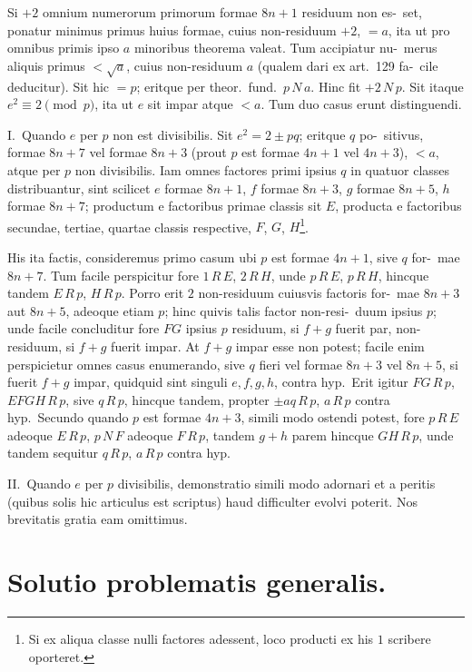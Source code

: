 \documentclass[12pt,a4paper]{article}
\theoremstyle{plain}
\theoremstyle{definition}
\theoremstyle{remark}
\begin{document}
Si $+2$ omnium numerorum primorum formae $8n+1$ residuum non es-\ set, ponatur minimus primus huius formae, cuius non-residuum $+2$, $= a$, ita
ut pro omnibus primis ipso $a$ minoribus theorema valeat. Tum accipiatur nu-\ merus aliquis primus $< \sqrt{a}$, cuius non-residuum $a$ (qualem dari ex art.~129 fa-\ cile deducitur). Sit hic $= p$; eritque per theor.\ fund.\ $p \, N \, a$. Hinc fit $+2 \, N \, p$.
Sit itaque $e^2 \equiv 2 \pmod{p}$, ita ut $e$ sit impar atque $< a$. Tum duo casus erunt
distinguendi.

I.\ Quando $e$ per $p$ non est divisibilis. Sit $e^2 = 2 \pm pq$; eritque $q$ po-\ sitivus, formae $8n+7$ vel formae $8n+3$ (prout $p$ est formae $4n+1$ vel
$4n+3$), $< a$, atque per $p$ non divisibilis. Iam omnes factores primi ipsius $q$
in quatuor classes distribuantur, sint scilicet $e$ formae $8n+1$, $f$ formae $8n+3$,
$g$ formae $8n+5$, $h$ formae $8n+7$; productum e factoribus primae classis sit
$E$, producta e factoribus secundae, tertiae, quartae classis respective, $F$, $G$, $H$\footnote{Si ex aliqua classe nulli factores adessent, loco producti ex his $1$ scribere oporteret.}.

His ita factis, consideremus primo casum ubi $p$ est formae $4n+1$, sive $q$ for-\ mae $8n+7$. Tum facile perspicitur fore $1 \, R \, E$, $2 \, R \, H$, unde $p \, R \, E$, $p \, R \, H$,
hincque tandem $E \, R \, p$, $H \, R \, p$. Porro erit $2$ non-residuum cuiusvis factoris for-\ mae $8n+3$ aut $8n+5$, adeoque etiam $p$; hinc quivis talis factor non-resi-\ duum ipsius $p$; unde facile concluditur fore $FG$ ipsius $p$ residuum, si $f+g$
fuerit par, non-residuum, si $f+g$ fuerit impar. At $f+g$ impar esse non potest;
facile enim perspicietur omnes casus enumerando, sive $q$ fieri vel formae
$8n+3$ vel $8n+5$, si fuerit $f+g$ impar, quidquid sint singuli $e,f,g,h$, contra
hyp.\ Erit igitur $FG \, R \, p$, $EFGH \, R \, p$, sive $q \, R \, p$, hincque tandem, propter
$\pm aq \, R \, p$, $a \, R \, p$ contra hyp.\ Secundo quando $p$ est formae $4n+3$, simili modo
ostendi potest, fore $p \, R \, E$ adeoque $E \, R \, p$, $p \, N \, F$ adeoque $F \, R \, p$, tandem
$g+h$ parem hincque $GH \, R \, p$, unde tandem sequitur $q \, R \, p$, $a \, R \, p$ contra hyp.

II.\ Quando $e$ per $p$ divisibilis, demonstratio simili modo adornari et a
peritis (quibus solis hic articulus est scriptus) haud difficulter evolvi poterit. Nos
brevitatis gratia eam omittimus.

\section*{Solutio problematis generalis.}
\end{document}
